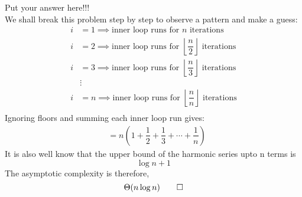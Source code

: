 \documentclass[a4paper,10pt]{article}
\newenvironment{answer}[1][height fill] {
    \begin{tcolorbox}[#1]
}
{
    \end{tcolorbox}
}
\begin{document}
\begin{answer}
    Put your answer here!!!\\
    We shall break this problem step by step to observe a pattern and make a guess:
    \begin{align*}
    	i&=1 \implies \text{inner loop runs for } n \text{ iterations} \\
    	i&=2 \implies \text{inner loop runs for } \left\lfloor{\dfrac{n}{2}}\right\rfloor \text{ iterations} \\
    	i&=3 \implies \text{inner loop runs for } \left\lfloor{\dfrac{n}{3}}\right\rfloor \text{ iterations} \\
    	&\vdots \\
    	i&=n \implies \text{inner loop runs for } \left\lfloor{\dfrac{n}{n}}\right\rfloor \text{ iterations} \\
    \end{align*}
    Ignoring floors and summing each inner loop run gives:
    \begin{align*}
    	&= n\left(1+\dfrac{1}{2}+\dfrac{1}{3}+\cdots+\dfrac{1}{n}\right)
    \end{align*}
    It is also well know that the upper bound of the harmonic series upto n terms is 
    $$ \log{n+1} $$
    The asymptotic complexity is therefore,
    $$ \Theta(n\log{n}) \qed$$
\end{answer}
\end{document}
